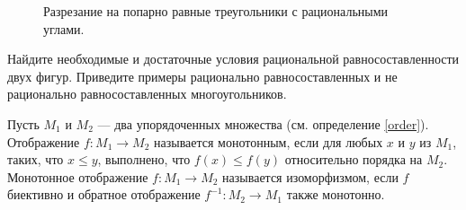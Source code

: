 \begin{enumerate}
\begin{figure}[h]
\begin{center}
\end{center}
\caption{Разрезание на попарно равные треугольники с рациональными углами.}
\end{figure}

Найдите необходимые и достаточные условия рациональной равносоставленности двух фигур. Приведите примеры рационально равносоставленных и не рационально равносоставленных многоугольников.
\end{enumerate}






Пусть $M_1$ и $M_2$ --- два упорядоченных множества (см. определение \ref{order}). Отображение $f\colon M_1 \to M_2$ называется монотонным, если для любых $x$ и $y$ из $M_1$, таких, что $x\leq y$, выполнено, что $f(x)\leq f(y)$ относительно порядка на $M_2$. Монотонное отображение $f\colon M_1\to M_2$ называется изоморфизмом, если $f$ биективно и обратное отображение $f^{-1}\colon M_2 \to M_1$ также монотонно.
